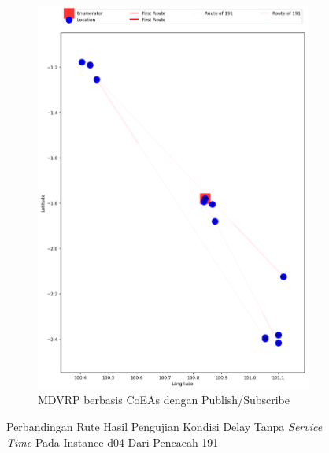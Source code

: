\begin{figure}[H]\ContinuedFloat
	\centering
	\begin{subfigure}[t]{\textwidth}
		\centering
		\includegraphics[width=\textwidth]{Resources/Images/delayed_5/real_m15_n100_delayed_5_191_pubsub_coes}
		\caption{MDVRP berbasis CoEAs dengan Publish/Subscribe}
		\label{fig:real_m15_n100_delayed_5_191_pubsub_coes}
	\end{subfigure}
	\caption{Perbandingan Rute Hasil Pengujian Kondisi Delay Tanpa \textit{Service Time} Pada Instance d04 Dari Pencacah 191}
	\label{fig:real_m15_n100_delayed_5_191_contd}
\end{figure}


